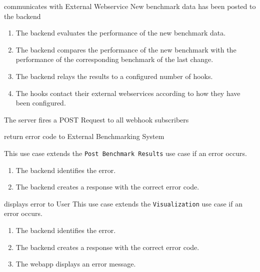 \bigskip

{communicates with External Webservice}
{New benchmark data has been posted to the backend}
{\begin{enumerate}
    \item The backend evaluates the performance of the new benchmark data.
    \item The backend compares the performance of the new benchmark with the performance of the corresponding benchmark of the last change.
    \item The backend relays the results to a configured number of hooks.
    \item The hooks contact their external webservices according to how they have been configured.
\end{enumerate}}
{The server fires a POST Request to all webhook subscribers}
{}

\bigskip

{return error code to External Benchmarking System}
{}
{This use case extends the \texttt{Post Benchmark Results} use case if an error occurs.
\begin{enumerate}
    \item The backend identifies the error.
    \item The backend creates a response with the correct error code.
\end{enumerate}}
{}
{}

\bigskip

{displays error to User}
{This use case extends the \texttt{Visualization} use case if an error occurs.}
{\begin{enumerate}
    \item The backend identifies the error.
    \item The backend creates a response with the correct error code.
    \item The webapp displays an error message.
\end{enumerate}}
{}
{}

